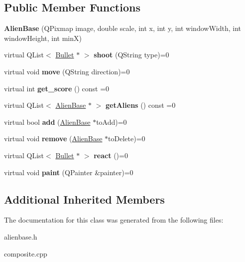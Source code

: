 \subsection*{Public Member Functions}
\begin{DoxyCompactItemize}
\item 
\mbox{\label{classgame_1_1AlienBase_a1262846978fc5ef94b021f86b86c5234}} 
{\bfseries Alien\+Base} (Q\+Pixmap image, double scale, int x, int y, int window\+Width, int window\+Height, int minX)
\item 
\mbox{\label{classgame_1_1AlienBase_ada5b0d95ed3c50ff8808c3cba369a5b7}} 
virtual Q\+List$<$ \hyperlink{classgame_1_1Bullet}{Bullet} $\ast$ $>$ {\bfseries shoot} (Q\+String type)=0
\item 
\mbox{\label{classgame_1_1AlienBase_a7aa35de643cd234ca37edb3298b1024d}} 
virtual void {\bfseries move} (Q\+String direction)=0
\item 
\mbox{\label{classgame_1_1AlienBase_a8ff5abe284c98fe915bfb5f1fcc6cd52}} 
virtual int {\bfseries get\+\_\+score} () const =0
\item 
\mbox{\label{classgame_1_1AlienBase_a5bc585ba514905960d2699780790b3b9}} 
virtual Q\+List$<$ \hyperlink{classgame_1_1AlienBase}{Alien\+Base} $\ast$ $>$ {\bfseries get\+Aliens} () const =0
\item 
\mbox{\label{classgame_1_1AlienBase_a2adba0274028ece504be8b574bf72047}} 
virtual bool {\bfseries add} (\hyperlink{classgame_1_1AlienBase}{Alien\+Base} $\ast$to\+Add)=0
\item 
\mbox{\label{classgame_1_1AlienBase_a580cc448b12a80d495ee21df6b7b54b0}} 
virtual void {\bfseries remove} (\hyperlink{classgame_1_1AlienBase}{Alien\+Base} $\ast$to\+Delete)=0
\item 
\mbox{\label{classgame_1_1AlienBase_a6e003cec05ee1fdb2e9181ae0f416670}} 
virtual Q\+List$<$ \hyperlink{classgame_1_1Bullet}{Bullet} $\ast$ $>$ {\bfseries react} ()=0
\item 
\mbox{\label{classgame_1_1AlienBase_a39ed231f233fb4e9e27cd0e4096129bd}} 
virtual void {\bfseries paint} (Q\+Painter \&painter)=0
\end{DoxyCompactItemize}
\subsection*{Additional Inherited Members}


The documentation for this class was generated from the following files\+:\begin{DoxyCompactItemize}
\item 
alienbase.\+h\item 
composite.\+cpp\end{DoxyCompactItemize}
